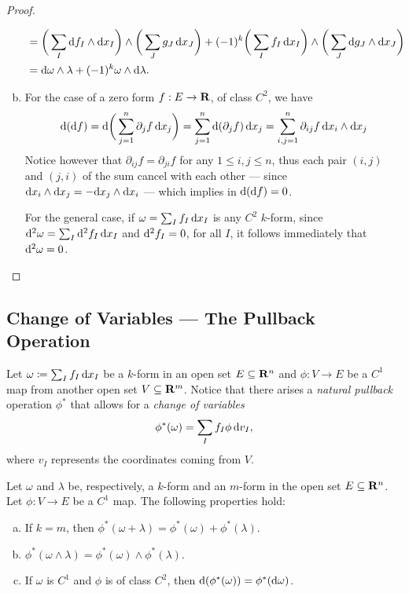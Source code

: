 \begin{proof}
\begin{enumerate}[(a)]
\begin{align*}
    &= \bigg( \sum_I \mathrm{d} f_I \wedge \mathrm{d} x_I\bigg) \wedge
      \bigg( \sum_J g_J\, \mathrm{d} x_J \bigg)
      + (-1)^k \bigg( \sum_I f_I\, \mathrm{d} x_I \bigg) \wedge
      \bigg( \sum_J \mathrm{d} g_J \wedge \mathrm{d} x_J \bigg) \\
    &= \mathrm{d} \omega \wedge \lambda + (-1)^k \omega \wedge \mathrm{d} \lambda.
  \end{align*}
\item For the case of a zero form \(f: E \to \mathbf{R}\), of class \(C^2\), we have
  \[
    \mathrm{d}(\mathrm{d} f) =
    \mathrm{d} \bigg( \sum_{j=1}^n \partial_j f\, \mathrm{d} x_j \bigg)
    = \sum_{j = 1}^n \mathrm{d} (\partial_j f)\, \mathrm{d} x_j
    = \sum_{i, j = 1}^n \partial_{i j} f\, \mathrm{d} x_i \wedge \mathrm{d} x_j
  \]
  Notice however that \(\partial_{i j} f = \partial_{j i} f\) for any \(1 \leq
  i, j \leq n\), thus each pair \((i, j)\) and \((j, i)\) of the sum cancel with
  each other --- since \(\mathrm{d} x_i \wedge \mathrm{d} x_j = - \mathrm{d} x_j \wedge \mathrm{d}
  x_i\) --- which implies in \(\mathrm{d}(\mathrm{d} f) = 0\).

  For the general case, if \(\omega = \sum_I f_I\, \mathrm{d} x_I\) is any \(C^2\)
  \(k\)-form, since \(\mathrm{d}^2 \omega = \sum_I \mathrm{d}^2 f_I\, \mathrm{d} x_I\) and
  \(\mathrm{d}^2 f_I = 0\), for all \(I\), it follows immediately that \(\mathrm{d}^2
  \omega = 0\).
\end{enumerate}
\end{proof}

\subsection{Change of Variables --- The Pullback Operation}

Let \(\omega \coloneq \sum_I f_I\, \mathrm{d} x_I\) be a \(k\)-form in an open set
\(E \subseteq \mathbf{R}^n\) and \(\phi: V \to E\) be a \(C^1\) map from another open
set \(V \subseteq \mathbf{R}^m\). Notice that there arises a \emph{natural pullback}
operation \(\phi^{*}\) that allows for a \emph{change of variables}
\begin{equation}
\label{eq:change-of-variables-forms}
  \phi^{*}(\omega) = \sum_I f_I \phi\, \mathrm{d} v_I,
\end{equation}
where \(v_I\) represents the coordinates coming from \(V\).

\begin{proposition}
\label{prop:algebraic-properties-pullback-forms}
Let \(\omega\) and \(\lambda\) be, respectively, a \(k\)-form and an \(m\)-form
in the open set \(E \subseteq \mathbf{R}^n\). Let \(\phi: V \to E\) be a \(C^{1}\)
map. The following properties hold:
\begin{enumerate}[(a)]\setlength\itemsep{0em}
\item If \(k = m\), then \(\phi^{*}(\omega + \lambda) = \phi^{*}(\omega) +
  \phi^{*}(\lambda)\).
\item \(\phi^{*}(\omega \wedge \lambda) = \phi^{*}(\omega) \wedge \phi^{*}
  (\lambda)\).
\item If \(\omega\) is \(C^{1}\) and \(\phi\) is of class \(C^2\), then
  \(\mathrm{d}(\phi^{*}(\omega)) = \phi^{*}(\mathrm{d} \omega)\).
\end{enumerate}
\end{proposition}

